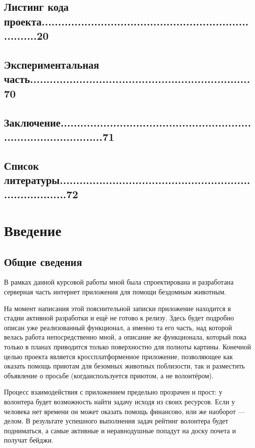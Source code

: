 \documentclass[12pt]{article}
\begin{document}
\subsection*{Листинг кода проекта.........................................................................20}
\subsection*{Экспериментальная часть...................................................................70}
\subsection*{Заключение........................................................................................71}
\subsection*{Список литературы.............................................................................72}

\newpage

\section*{Введение}
\subsection*{Общие сведения}

В рамках данной курсовой работы мной была спроектирована и разработана серверная часть интернет приложения для помощи бездомным животным.

На момент написания этой пояснительной записки приложение находится в стадии активной разработки и ещё не готово к релизу. Здесь будет подробно описан уже реализованный функционал, а именно та его часть, над которой велась работа непосредственно мной, а описание же функционала, который пока только в планах приводится только поверхностно для полноты картины. Конечной целью проекта является кроссплатформенное приложение, позволяющее как оказать помощь приютам для безомных животных поблизости, так и разместить объявление о просьбе (когдаиспользуется приютом, а не волонтёром). 

Процесс взаимодействия с приложением предельно прозрачен и прост: у волонтера будет возможность найти задачу исходя из своих ресурсов. Если у человека нет времени он может оказать помощь финансово, или же наоборот --- делом. В результате успешного выполнения задач рейтинг волонтера будет подниматься, а самые активные и неравнодушные попадут на доску почета и получат бейджи. 
\end{document}
